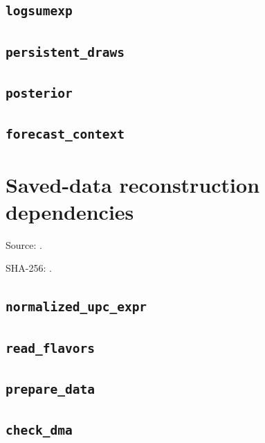 \subsection{\texttt{logsumexp}}

\subsection{\texttt{persistent\_draws}}

\subsection{\texttt{posterior}}

\subsection{\texttt{forecast\_context}}

\clearpage
\section{Saved-data reconstruction dependencies}
\noindent Source: .\par
\noindent SHA-256: {\scriptsize{}}.\par\medskip
\subsection{\texttt{normalized\_upc\_expr}}

\subsection{\texttt{read\_flavors}}

\subsection{\texttt{prepare\_data}}

\subsection{\texttt{check\_dma}}

